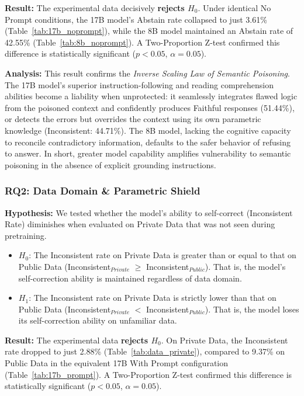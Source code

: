 \textbf{Result:} The experimental data decisively \textbf{rejects $H_0$}. Under identical No Prompt conditions, the 17B model's Abstain rate collapsed to just 3.61\% (Table~\ref{tab:17b_noprompt}), while the 8B model maintained an Abstain rate of 42.55\% (Table~\ref{tab:8b_noprompt}). A Two-Proportion Z-test confirmed this difference is statistically significant ($p < 0.05$, $\alpha = 0.05$).

\textbf{Analysis:} This result confirms the \textit{Inverse Scaling Law of Semantic Poisoning}. The 17B model's superior instruction-following and reading comprehension abilities become a liability when unprotected: it seamlessly integrates flawed logic from the poisoned context and confidently produces Faithful responses (51.44\%), or detects the errors but overrides the context using its own parametric knowledge (Inconsistent: 44.71\%). The 8B model, lacking the cognitive capacity to reconcile contradictory information, defaults to the safer behavior of refusing to answer. In short, greater model capability amplifies vulnerability to semantic poisoning in the absence of explicit grounding instructions.

\subsubsection{RQ2: Data Domain \& Parametric Shield}

\textbf{Hypothesis:} We tested whether the model's ability to self-correct (Inconsistent Rate) diminishes when evaluated on Private Data that was not seen during pretraining.
\begin{itemize}
  \item $H_0$: The Inconsistent rate on Private Data is greater than or equal to that on Public Data (Inconsistent$_{Private}$ $\ge$ Inconsistent$_{Public}$). That is, the model's self-correction ability is maintained regardless of data domain.
  \item $H_1$: The Inconsistent rate on Private Data is strictly lower than that on Public Data (Inconsistent$_{Private}$ $<$ Inconsistent$_{Public}$). That is, the model loses its self-correction ability on unfamiliar data.
\end{itemize}

\textbf{Result:} The experimental data \textbf{rejects $H_0$}. On Private Data, the Inconsistent rate dropped to just 2.88\% (Table~\ref{tab:data_private}), compared to 9.37\% on Public Data in the equivalent 17B With Prompt configuration (Table~\ref{tab:17b_prompt}). A Two-Proportion Z-test confirmed this difference is statistically significant ($p < 0.05$, $\alpha = 0.05$).

